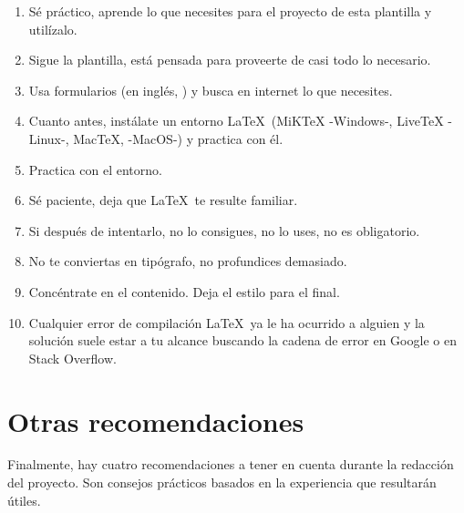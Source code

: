 \begin{enumerate}

	\item Sé práctico, aprende lo que necesites para el proyecto de esta plantilla y utilízalo.

	\item Sigue la plantilla, está pensada para proveerte de casi todo lo necesario.

	\item Usa formularios (en inglés, ) y busca en internet lo que necesites.

	\item Cuanto antes, instálate un entorno \LaTeX\ (MiKTeX -Windows-, LiveTeX -Linux-, MacTeX, -MacOS-) y practica con él.

	\item Practica con el entorno.

	\item Sé paciente, deja que \LaTeX\ te resulte familiar.

	\item Si después de intentarlo, no lo consigues, no lo uses, no es obligatorio.

	\item No te conviertas en tipógrafo, no profundices demasiado.

	\item Concéntrate en el contenido. Deja el estilo para el final.

	\item Cualquier error de compilación \LaTeX\ ya le ha ocurrido a alguien y la solución suele estar a tu alcance buscando la cadena de error en Google o en Stack Overflow.

\end{enumerate}


\section{Otras recomendaciones}

Finalmente, hay cuatro recomendaciones a tener en cuenta durante la redacción del proyecto. Son consejos prácticos basados en la experiencia que resultarán útiles.

